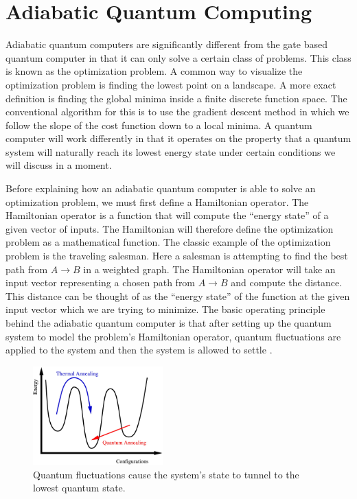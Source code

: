 \documentclass[conference]{IEEEtran}
\begin{document}
\section{Adiabatic Quantum Computing}

Adiabatic quantum computers are significantly different from the gate based quantum computer in that it can only solve a certain class of problems. This class is known as the optimization problem. A common way to visualize the optimization problem is finding the lowest point on a landscape. A more exact definition is finding the global minima inside a finite discrete function space. The conventional algorithm for this is to use the gradient descent method in which we follow the slope of the cost function down to a local minima. A quantum computer will work differently in that it operates on the property that a quantum system will naturally reach its lowest energy state under certain conditions we will discuss in a moment.

Before explaining how an adiabatic quantum computer is able to solve an optimization problem, we must first define a Hamiltonian operator. The Hamiltonian operator is a function that will compute the ``energy state'' of a given vector of inputs. The Hamiltonian will therefore define the optimization problem as a mathematical function. The classic example of the optimization problem is the traveling salesman. Here a salesman is attempting to find the best path from $A \rightarrow B$ in a weighted graph. The Hamiltonian operator will take an input vector representing a chosen path from $A \rightarrow B$ and compute the distance. This distance can be thought of as the ``energy state'' of the function at the given input vector which we are trying to minimize. The basic operating principle behind the adiabatic quantum computer is that after setting up the quantum system to model the problem's Hamiltonian operator, quantum fluctuations are applied to the system and then the system is allowed to settle \cite{b10}.

\begin{figure}[htbp]
\centerline{\includegraphics[width=5cm]{annealing}}
\caption{Quantum fluctuations cause the system's state to tunnel to the lowest quantum state.}
\label{annealing}
\end{figure}
\end{document}
